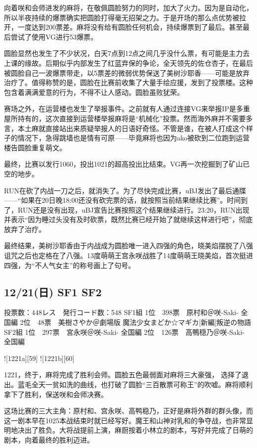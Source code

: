 向着咲和会师进发的麻将，在敬佩圆脸努力的同时，加大了火力。因为是自动化，所以半夜持续的爆票确实把圆脸打得毫无招架之力。于是开场的那么点优势被拉开，一度达到200票差。麻将没有给有圆脸任何机会，持续爆票到了最后。甚至最后尝试了使用VG进行53爆票。

圆脸显然也发生了不少状况，白天7点到12点之间几乎没什么票，有可能是主力去上课的缘故。后期似乎内部发生了红蓝弃保的争论，全天领先的佐仓杏子，在最后被圆脸自己一波爆票带走，以5票差的微弱优势保送了美树沙耶香——可能是放弃治疗了。值得称赞的是，圆脸在比赛前收集了大量手绘应援，发到了投票楼。这种包含着满满爱意的行为，不得不让人感动。圆脸虽败犹荣。

赛场之外，在运营楼也发生了举报事件。之前就有人通过连接VG来举报IP是多重屋所持有的，这次直接到运营楼举报麻将是“机械化”投票。然而海外麻并不需要多言，本土麻就直接站出来质疑举报人的日语好奇怪。不管是谁，在被人打成这个样子的情况下，急得跳墙也是情有可原——毕竟麻将也因为ako被砍到二位跑到运营楼告圆脸重复萌文。

最终，比赛以发行1060，投出1021的超高投出比结束。VG再一次挖掘到了矿山已空的地步。

RUN在砍了内战一刀之后，就消失了。为了尽快完成比赛，uBJ发出了最后通牒——“如果在20日晚18:00还没有砍完票的话，就按照当前结果继续比赛”。时间到了，RUN还是没有出现，uBJ宣告比赛按照这个结果继续进行。23:20，RUN出现并表示“因为睡过头没有及时砍票，既然比赛已经开始了就继续这样进行吧”，彻底放弃了治疗。

最终结果，美树沙耶香由于内战成为圆脸唯一进入四强的角色，晓美焰摆脱了八强诅咒之后也定格在了八强。13度萌萌王宫永咲战胜了14度萌萌王晓美焰，首次挺进四强，为“不人气女主”的称号画上了句号。

\subsection{12/21(日) SF1 SF2}

    投票数：448レス　発行コード数：548
    SF1組
    1位　398票　原村和＠咲-Saki- 全国編
    2位　48票　美樹さやか＠劇場版 魔法少女まどか☆マギカ[新編]叛逆の物語
    SF2組
    1位　297票　宮永咲＠咲-Saki- 全国編
    2位　126票　高鴨穏乃＠咲-Saki- 全国編

![1221a][59]
![1221b][60]

1221，终于，麻将完成了胜利会师。圆脸五色最弱面对麻将三大豪强， 选择了退出。蓝毛全天一贫如洗的曲线，也打破了圆脸“三百散票可称王”的吹嘘。麻将顺利拿下了胜利，保送咲和会师决赛。

这场比赛的三大主角：原村和、宫永咲、高鸭稳乃，正好是麻将外群的群头像，而这一剧本早在1025本战结束时就已经写好。魔王和山神对乳和的争夺战，也非常显明地决出了胜负。大将战提前上演，麻厨按着小林立的剧本，写好并完成了日萌的剧本，向着最终的胜利迈进。

